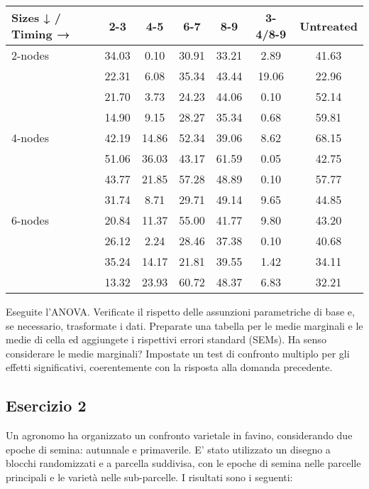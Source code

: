 \documentclass[a4paper,12pt,oneside]{book}
\begin{document}
\begin{longtable}[]{@{}lcccccc@{}}
\toprule
Sizes ↓ / Timing → & 2-3 & 4-5 & 6-7 & 8-9 & 3-4/8-9 & Untreated \\
\midrule
\endhead
2-nodes & 34.03 & 0.10 & 30.91 & 33.21 & 2.89 & 41.63 \\
& 22.31 & 6.08 & 35.34 & 43.44 & 19.06 & 22.96 \\
& 21.70 & 3.73 & 24.23 & 44.06 & 0.10 & 52.14 \\
& 14.90 & 9.15 & 28.27 & 35.34 & 0.68 & 59.81 \\
4-nodes & 42.19 & 14.86 & 52.34 & 39.06 & 8.62 & 68.15 \\
& 51.06 & 36.03 & 43.17 & 61.59 & 0.05 & 42.75 \\
& 43.77 & 21.85 & 57.28 & 48.89 & 0.10 & 57.77 \\
& 31.74 & 8.71 & 29.71 & 49.14 & 9.65 & 44.85 \\
6-nodes & 20.84 & 11.37 & 55.00 & 41.77 & 9.80 & 43.20 \\
& 26.12 & 2.24 & 28.46 & 37.38 & 0.10 & 40.68 \\
& 35.24 & 14.17 & 21.81 & 39.55 & 1.42 & 34.11 \\
& 13.32 & 23.93 & 60.72 & 48.37 & 6.83 & 32.21 \\
\bottomrule
\end{longtable}

Eseguite l'ANOVA. Verificate il rispetto delle assunzioni parametriche di base e, se necessario, trasformate i dati. Preparate una tabella per le medie marginali e le medie di cella ed aggiungete i rispettivi errori standard (SEMs). Ha senso considerare le medie marginali? Impostate un test di confronto multiplo per gli effetti significativi, coerentemente con la risposta alla domanda precedente.

\hypertarget{esercizio-2-6}{%
\subsection{Esercizio 2}\label{esercizio-2-6}}

Un agronomo ha organizzato un confronto varietale in favino, considerando due epoche di semina: autunnale e primaverile. E' stato utilizzato un disegno a blocchi randomizzati e a parcella suddivisa, con le epoche di semina nelle parcelle principali e le varietà nelle sub-parcelle. I risultati sono i seguenti:
\end{document}

